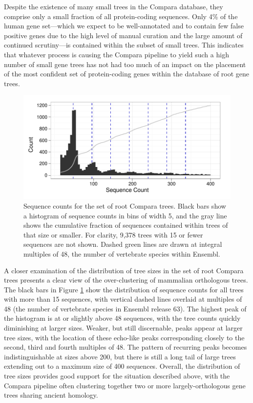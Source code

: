 Despite the existence of many small trees in the Compara database,
they comprise only a small fraction of all protein-coding
sequences. Only 4\% of the human gene set---which we expect to be
well-annotated and to contain few false positive genes due to the high
level of manual curation and the large amount of continued
scrutiny---is contained within the subset of small trees. This
indicates that whatever process is causing the Compara pipeline to
yield such a high number of small gene trees has not had too much of
an impact on the placement of the most confident set of protein-coding
genes within the database of root gene trees.

\begin{figure}[ht]
\centering
\includegraphics[scale=0.9]{Figs/ensembl_roots_hist.pdf}
\caption{Sequence counts for the set of root Compara trees. Black bars
  show a histogram of sequence counts in bins of width 5, and the gray
  line shows the cumulative fraction of sequences contained within
  trees of that size or smaller. For clarity, 9,378 trees with 15 or
  fewer sequences are not shown. Dashed green lines are drawn at
  integral multiples of 48, the number of vertebrate species within
  Ensembl.}
\label{ensembl_roots_hist}
\end{figure}

A closer examination of the distribution of tree sizes in the set of
root Compara trees presents a clear view of the over-clustering of
mammalian orthologous trees. The black bars in Figure
\ref{ensembl_roots_hist} show the distribution of sequence counts for
all trees with more than 15 sequences, with vertical dashed lines
overlaid at multiples of 48 (the number of vertebrate species in
Ensembl release 63). The highest peak
of the histogram is at or slightly above 48 sequences, with the tree
counts quickly diminishing at larger sizes. Weaker, but still
discernable, peaks appear at larger tree sizes, with the location of
these echo-like peaks corresponding closely to the second, third and
fourth multiples of 48. The pattern of recurring peaks becomes
indistinguishable at sizes above 200, but there is still a long tail
of large trees extending out to a maximum size of 400
sequences. Overall, the distribution of tree sizes provides good
support for the situation described above, with the Compara pipeline
often clustering together two or more largely-orthologous gene trees
sharing ancient homology.

